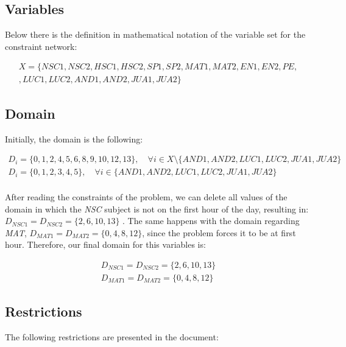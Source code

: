 \subsection{Variables}
Below there is the definition in mathematical notation of the variable set for the constraint network:

\begin{multline}\label{eq: part 1 - variables}
    X = \{ NSC1, NSC2, HSC1, HSC2, SP1, SP2, MAT1, MAT2, EN1, EN2, PE,\\ ,LUC1, LUC2, AND1, AND2, JUA1, JUA2 \}
\end{multline}

\subsection{Domain}
Initially, the domain is the following:

\begin{gather}\label{eq: part 1 - domain}
    D_i = \{ 0, 1, 2, 4, 5, 6, 8, 9, 10, 12, 13 \}, \quad \forall i \in X \setminus \{ AND1, AND2, LUC1, LUC2, JUA1, JUA2 \}\\
    D_i = \{ 0, 1, 2, 3, 4, 5 \}, \quad \forall i \in \{ AND1, AND2, LUC1, LUC2, JUA1, JUA2 \}
\end{gather}

\paragraph{}
 After reading the constraints of the problem, we can delete all values of the domain in which the \textit{NSC} subject is not on the first hour of the day, resulting in: $D_{NSC1} = D_{NSC2} = \{2, 6, 10, 13\}$ . The same happens with the domain regarding \textit{MAT}, $D_{MAT1} = D_{MAT2} = \{0, 4, 8, 12\}$, since the problem forces it to be at first hour. Therefore, our final domain for this variables is:
 
\begin{gather}\label{eq: part 1 - reduced domain}
    D_{NSC1} = D_{NSC2} = \{ 2, 6, 10, 13 \}\\
    D_{MAT1} = D_{MAT2} = \{ 0, 4, 8, 12 \}
\end{gather}

\subsection{Restrictions}
The following restrictions are presented in the document:

